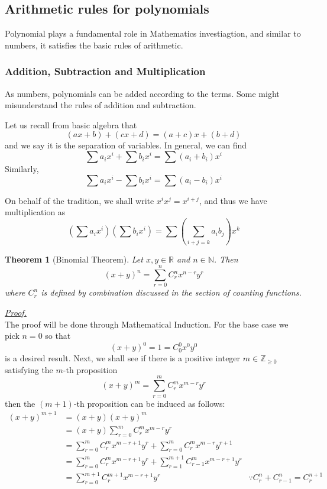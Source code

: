 \documentclass[12pt]{article}
\newtheorem*{theorem}{Theorem}
\renewenvironment{proof}[1][Proof]{\begin{snugshade*} \underline{\textit{{#1}.}}\\}{\hfill \qedsymbol \end{snugshade*}}
\begin{document}
    \subsection{Arithmetic rules for polynomials}

    Polynomial plays a fundamental role in Mathematics investiagtion, and similar to numbers, it satisfies the basic rules of arithmetic.

    \subsubsection*{Addition, Subtraction and Multiplication}

    As numbers, polynomials can be added according to the terms. Some might misunderstand the rules of addition and subtraction.

    Let us recall from basic algebra that \[(ax+b)+(cx+d)=(a+c)x+(b+d)\] and we say it is the separation of variables. In general, we can find \[\sum a_i x^i + \sum b_i x^i = \sum (a_i + b_i) x^i\] Similarly, \[\sum a_i x^i - \sum b_i x^i = \sum (a_i - b_i) x^i\]

    On behalf of the tradition, we shall write $x^i x^j = x^{i+j}$, and thus we have multiplication as \[(\sum a_i x^i)(\sum b_i x^i) = \sum (\sum_{i+j=k} a_i b_j) x^k\]

    \begin{theorem}[Binomial Theorem]
        Let $x,y\in\mathbb{R}$ and $n\in\mathbb{N}$. Then \[(x+y)^n=\sum_{r=0}^{n}C_r^n x^{n-r} y^{r}\] where $C_r^n$ is defined by combination discussed in the section of counting functions.
    \end{theorem}

    \begin{proof}
        The proof will be done through Mathematical Induction. For the base case we pick $n=0$ so that \[(x+y)^0=1=C_0^0 x^0 y^0\] is a desired result. Next, we shall see if there is a positive integer $m\in\mathbb{Z}_{\geq 0}$ satisfying the $m$-th proposition \[(x+y)^m=\sum_{r=0}^{m}C_r^m x^{m-r} y^{r}\] then the $(m+1)$-th proposition can be induced as follows:\begin{align*}
            (x+y)^{m+1}&=(x+y)(x+y)^m\\
            &=(x+y)\sum_{r=0}^{m}C_r^m x^{m-r} y^{r}\\
            &=\sum_{r=0}^{m}C_r^m x^{m-r+1} y^{r} + \sum_{r=0}^{m}C_r^m x^{m-r} y^{r+1}\\
            &=\sum_{r=0}^{m}C_r^m x^{m-r+1} y^{r} + \sum_{r=1}^{m+1}C_{r-1}^m x^{m-r+1} y^{r}\\
            &=\sum_{r=0}^{m+1}C_r^{m+1} x^{m-r+1} y^{r} &\because C_r^n+C_{r-1}^n=C_r^{n+1}
        \end{align*}
    \end{proof}
\end{document}
